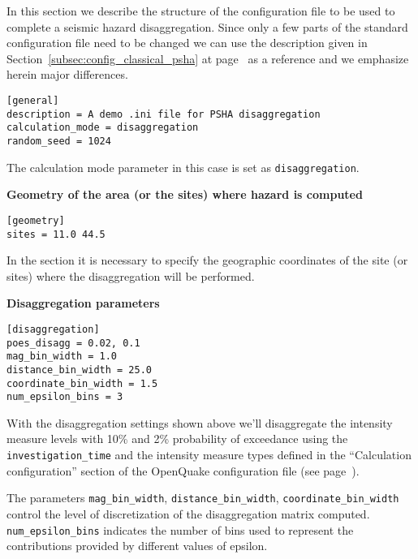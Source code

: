In this section we describe the structure of the configuration file to be used
to complete a seismic hazard disaggregation. Since only a few parts of the
standard configuration file need to be changed we can use the description
given in Section~\ref{subsec:config_classical_psha} at
page~\pageref{subsec:config_classical_psha} as a reference and we emphasize
herein major differences.


\begin{verbatim}
[general]
description = A demo .ini file for PSHA disaggregation
calculation_mode = disaggregation
random_seed = 1024
\end{verbatim}

The calculation mode parameter in this case is set as
\texttt{disaggregation}.



\textbf{Geometry of the area (or the sites) where hazard is computed}

\begin{verbatim}
[geometry]
sites = 11.0 44.5
\end{verbatim}

In the section it is necessary to specify the geographic coordinates of
the site (or sites) where the disaggregation will be performed.



\textbf{Disaggregation parameters}

\begin{verbatim}
[disaggregation]
poes_disagg = 0.02, 0.1
mag_bin_width = 1.0
distance_bin_width = 25.0
coordinate_bin_width = 1.5
num_epsilon_bins = 3
\end{verbatim}

With the disaggregation settings shown above we'll disaggregate the intensity
measure levels with 10\% and 2\% probability of exceedance using the
\texttt{in\-ves\-ti\-gation\_time} and the intensity measure types  defined in
the ``Calculation configuration'' section of the OpenQuake configuration file
(see page~\pageref{sec:calculation_configuration}).

The parameters \texttt{mag\_bin\_width},  \texttt{distance\_bin\_width},
\texttt{coordinate\_bin\_width} control the level of discretization of the
disaggregation matrix computed. \texttt{num\_epsilon\_bins} indicates the
number of bins used to represent the contributions provided by different
values of epsilon.


